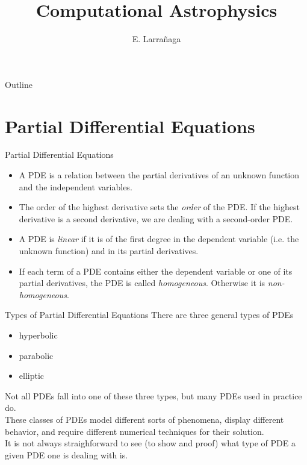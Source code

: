 \documentclass[11pt]{beamer}
\begin{document}
\begin{frame}
\title{Computational Astrophysics}
\author{E. Larrañaga}
\titlepage
\end{frame}

\begin{frame}{Outline}
\tableofcontents
\end{frame}

\section{Partial Differential Equations }
\begin{frame}[fragile]{Partial Differential Equations}
\begin{itemize}
\item A PDE is a relation between the partial derivatives of an unknown
function and the independent variables.
\item The order of the highest derivative sets the \emph{order} of the PDE.
If the highest derivative is a second derivative, we are dealing with
a second-order PDE.
\item A PDE is \emph{linear} if it is of the first degree in the dependent 
variable (i.e. the unknown function) and in its partial derivatives.
\item If each term of a PDE contains either the dependent variable
or one of its partial derivatives, the PDE is called \emph{homogeneous}.
Otherwise it is \emph{non-homogeneous}.
\end{itemize}
\end{frame}


\begin{frame}[fragile]{Types of Partial Differential Equations}
There are three general types of PDEs
\begin{itemize}
\item hyperbolic
\item parabolic
\item elliptic
\end{itemize}  

Not all PDEs fall into one of these three types, but many
PDEs used in practice do. \\

These classes of PDEs model different sorts
of phenomena, display different behavior, and require different numerical
techniques for their solution.\\

It is not always straighforward to see (to show and proof) what type
of PDE a given PDE one is dealing with is. 
\end{frame}
\end{document}
